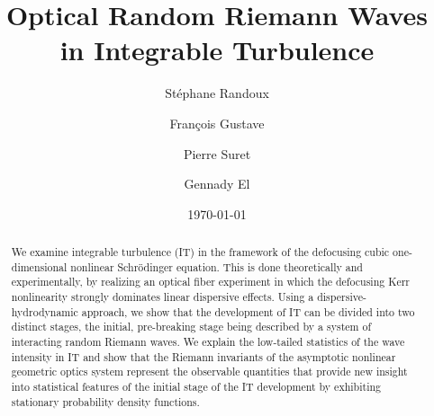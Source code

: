 \documentclass[twocolumn,preprintnumbers,amsmath,amssymb,superscriptaddress]{revtex4}
\begin{document}
\title{Optical Random Riemann Waves in Integrable Turbulence}%

\author{St\'ephane Randoux}
\author{Fran\c{c}ois Gustave}
\author{Pierre Suret}
\author{Gennady El}

\date{\today}%


\begin{abstract}

We examine integrable turbulence (IT) in the framework of the defocusing cubic one-dimensional nonlinear
Schr\"{o}dinger equation. This is done theoretically and experimentally, by realizing an optical fiber
experiment in which the defocusing Kerr nonlinearity strongly dominates linear dispersive effects.
Using a dispersive-hydrodynamic approach, we show that the development of IT can be divided
into two distinct stages, the initial, pre-breaking stage being described by a system of interacting random
Riemann waves. We explain the low-tailed statistics of the wave intensity in IT and show that the
Riemann invariants of the asymptotic nonlinear geometric optics system represent the observable
quantities that provide new insight into statistical features of the initial stage of the IT development
by exhibiting stationary probability density functions.
\end{abstract}


\maketitle
\end{document}
